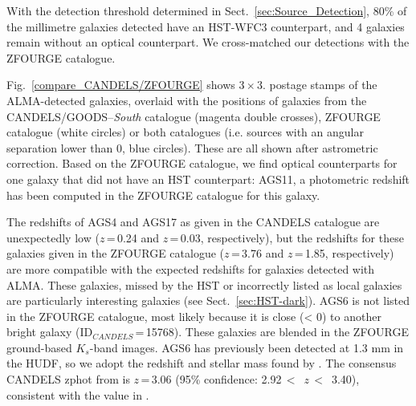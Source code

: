 \documentclass[longauth]{aa}
\begin{document}
With the detection threshold determined in Sect.~\ref{sec:Source_Detection}, 80\% of the millimetre galaxies detected have an HST-WFC3 counterpart, and 4 galaxies remain without an optical counterpart. We cross-matched our detections with the ZFOURGE catalogue.

Fig.~\ref{compare_CANDELS/ZFOURGE} shows 3\,$\times$\,3. postage stamps of the ALMA-detected galaxies, overlaid with the positions of galaxies from the CANDELS/GOODS--\textit{South} catalogue (magenta double crosses), ZFOURGE catalogue (white circles) or both catalogues (i.e. sources with an angular separation lower than 0, blue circles). These are all shown after astrometric correction. Based on the ZFOURGE catalogue, we find optical counterparts for one galaxy that did not have an HST counterpart: AGS11, a photometric redshift has been computed in the ZFOURGE catalogue for this galaxy.

The redshifts of AGS4 and AGS17 as given in the CANDELS catalogue are unexpectedly low ($z$\,=\,0.24 and $z$\,=\,0.03, respectively), but the redshifts for these galaxies given in the ZFOURGE catalogue ($z$\,=\,3.76 and $z$\,=\,1.85, respectively) are more compatible with the expected redshifts for galaxies detected with ALMA. These galaxies, missed by the HST or incorrectly listed as local galaxies are particularly interesting galaxies (see Sect.~\ref{sec:HST-dark}). AGS6 is not listed in the ZFOURGE catalogue, most likely because it is close (< 0) to another bright galaxy (ID$_{CANDELS}$\,=\,15768). These galaxies are blended in the ZFOURGE ground-based $K_s$-band images. AGS6 has previously been detected at 1.3 mm in the HUDF, so we adopt the redshift and stellar mass found by \cite{Dunlop2017}. The consensus CANDELS zphot from \cite{Santini2015} is $z$\,=\,3.06 (95\% confidence: 2.92\,$<$\, $z$\,$<$\, 3.40), consistent with the value in \cite{Dunlop2017}.
\end{document}
